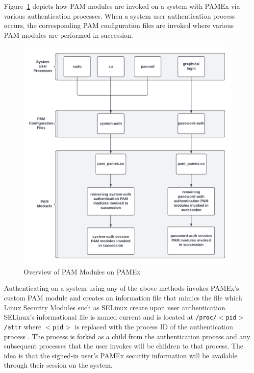 Figure~\ref{PAM Diagram} depicts how PAM modules are invoked on a system with PAMEx via various authentication processes.
When a system user authentication process occurs, the corresponding PAM configuration files are invoked where various PAM
modules are performed in succession.

\begin{figure}[h]
\centering
\includegraphics[width=.9\textwidth]{section04/assets/pam_overview.png}
\caption[Overview of PAM Modules on PAMEx]{\label{PAM Diagram}Overview of PAM Modules on PAMEx}
\end{figure}

Authenticating on a system using any of the above methods invokes PAMEx’s 
custom PAM module and creates an information file that mimics the file 
which Linux Security Modules such as SELinux create upon user 
authentication. SELinux’s informational file is named current and is 
located at \texttt{/proc/$<$pid$>$/attr} where \texttt{$<$pid$>$} is replaced with the process 
ID of the authentication process \cite{selinux}. The process is forked as a child from the 
authentication process and any subsequent processes that the user invokes will be children to
that process. The idea is that the signed-in user's PAMEx security information will be available
through their session on the system.

